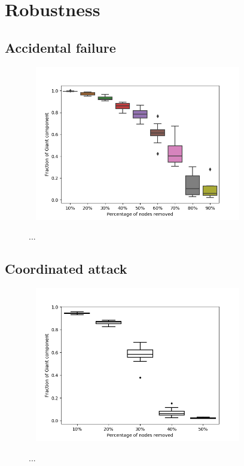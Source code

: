 \section{Robustness}

\subsection{Accidental failure}

\begin{figure}[!htb]
	\hspace*{-1cm}\ 
	\centering
	\includegraphics[width=9cm]{images/robustness_barabasi.png}
	\caption{ ...
	}
	\label{fig:alloc}
	\hspace*{2mm} 
\end{figure}

\subsection{Coordinated attack}

\begin{figure}[!htb]
	\hspace*{-1cm}\ 
	\centering
	\includegraphics[width=9cm]{images/robustness_coordinated.png}
	\caption{ ...
	}
	\label{fig:alloc}
	\hspace*{2mm}
\end{figure}

